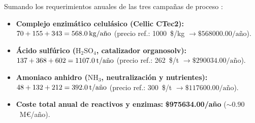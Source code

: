 \documentclass{report}
\begin{document}
\begin{tcolorbox}[colback=blue!5!white,colframe=blue!75!black,title=\textbf{Consumos Anuales Agregados de Insumos Químicos y Enzimáticos ($\text{B-5}^* = \SI{120000}{\tonne\text{ b.s.}/a\text{\~{n}}o}$)}]
    Sumando los requerimientos anuales de las tres campañas de proceso \autocite[Tabla~5 y Tabla~8]{Jafari-Gohargan2026}:
    \begin{itemize}
        \item \textbf{Complejo enzimático celulásico (Cellic CTec2):} $70 + 155 + 343 = \textbf{\SI{568.0}{\kilo\gram/a\text{\~{n}}o}}$ (precio ref.: \num{1000}~\$/kg $\rightarrow \$\num{568000.00}/\text{año}$).
        \item \textbf{Ácido sulfúrico ($\mathrm{H_2SO_4}$, catalizador organosolv):} $137 + 368 + 602 = \textbf{\SI{1107.0}{\tonne/a\text{\~{n}}o}}$ (precio ref.: \num{262}~\$/t $\rightarrow \$\num{290034.00}/\text{año}$).
        \item \textbf{Amoniaco anhidro ($\mathrm{NH_3}$, neutralización y nutrientes):} $48 + 132 + 212 = \textbf{\SI{392.0}{\tonne/a\text{\~{n}}o}}$ (precio ref.: \num{300}~\$/t $\rightarrow \$\num{117600.00}/\text{año}$).
        \item \textbf{Coste total anual de reactivos y enzimas:} \textbf{\$\num{975634.00}/año} ($\sim \num{0.90}$~M€/año).
    \end{itemize}
\end{tcolorbox}

\clearpage
\end{document}
